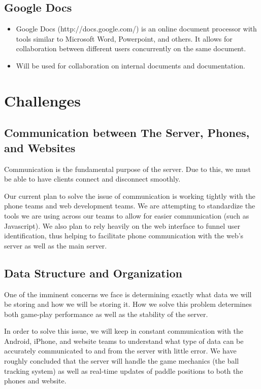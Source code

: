 \documentclass[letterpaper,12pt]{article}
\begin{document}
\subsection{Google Docs}
	\begin{itemize}
		\item Google Docs (http://docs.google.com/) is an online document processor with tools similar to Microsoft Word, Powerpoint, and others. It allows for collaboration between different users concurrently on the same document.
		\item Will be used for collaboration on internal documents and documentation.
	\end{itemize}

\section{Challenges}
\subsection{Communication between The Server, Phones, and Websites}
	Communication is the fundamental purpose of the server. Due to this, we must be able to have clients connect and disconnect smoothly.
 
 	Our current plan to solve the issue of communication is working tightly with the phone teams and web development teams. We are attempting to standardize the tools we are using across our teams to allow for easier communication (such as Javascript). We also plan to rely heavily on the web interface to funnel user identification, thus helping to facilitate phone communication with the web’s server as well as the main server.
\subsection{Data Structure and Organization}
	One of the imminent concerns we face is determining exactly what data we will be storing and how we will be storing it. How we solve this problem determines both game-play performance as well as the stability of the server.
 
	In order to solve this issue, we will keep in constant communication with the Android, iPhone, and website teams to understand what type of data can be accurately communicated to and from the server with little error. We have roughly concluded that the server will handle the game mechanics (the ball tracking system) as well as real-time updates of paddle positions to both the phones and website.
	                 	
\end{document}
